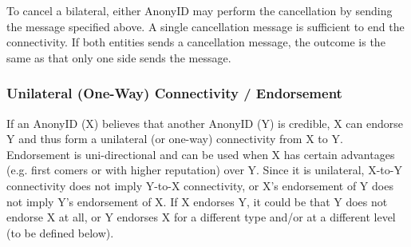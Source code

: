 \documentclass[12pt, a4paper]{article}
\begin{document}
\begin{description}
To cancel a bilateral, either AnonyID may perform the cancellation by sending the message specified above. A single cancellation message is sufficient to end the connectivity. If both entities sends a cancellation message, the outcome is the same as that only one side sends the message.

\end{description}

\subsubsection{Unilateral (One-Way) Connectivity / Endorsement}
\label{one-way}

If an AnonyID (X) believes that another AnonyID (Y) is credible, X can endorse Y and thus form a unilateral (or one-way) connectivity from X to Y. Endorsement is uni-directional and can be used when X has certain advantages (e.g. first comers or with higher reputation) over Y. Since it is unilateral, X-to-Y connectivity does not imply Y-to-X connectivity, or X's endorsement of Y does not imply Y's endorsement of X. If X endorses Y, it could be that Y does not endorse X at all, or Y endorses X for a different type and/or at a different level (to be defined below).
\end{document}
